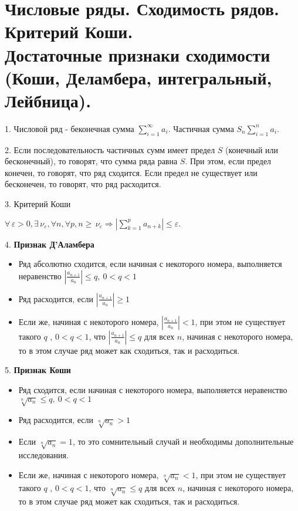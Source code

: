 \section{
	Числовые ряды. Сходимость рядов. Критерий Коши. \\
    Достаточные признаки сходимости (Коши, Деламбера, интегральный, Лейбница). 
}

1. Числовой ряд - беконечная сумма $\displaystyle \sum _{{i=1}}^{{\infty }}a_{i}$. Частичная сумма $\displaystyle S_n  \sum _{{i=1}}^{{n}}a_{i}$. 

2. Если последовательность частичных сумм имеет предел ${\displaystyle S}$ (конечный или бесконечный), 
то говорят, что сумма ряда равна ${\displaystyle S.}$ При этом, если предел конечен, то говорят, что ряд сходится. 
Если предел не существует или бесконечен, то говорят, что ряд расходится.

3. Критерий Коши

$
{\displaystyle \forall \,\varepsilon >0,\exists \,\nu _{\varepsilon },\forall n,\forall p,}
{\displaystyle n\geqslant \,\nu _{\varepsilon }\Rightarrow \left|\sum _{k=1}^{p}{a_{n+k}}\right|\leqslant \varepsilon .}
$

4. \textbf{Признак Д'Аламбера}
\begin{itemize}
    \item Ряд абсолютно сходится, если начиная с некоторого номера, выполняется неравенство
    ${\displaystyle \left|{\frac {a_{n+1}}{a_{n}}}\right|\leqslant q,~0<q<1}$
    \item Ряд расходится, если ${\displaystyle \left|{\frac {a_{n+1}}{a_{n}}}\right|\geqslant 1}$
    \item Если же, начиная с некоторого номера, 
    ${\displaystyle \left|{\frac {a_{n+1}}{a_{n}}}\right|<1}$, при этом не существует такого ${\displaystyle q}$ , 
    ${\displaystyle 0<q<1}$, что ${\displaystyle \left|{\frac {a_{n+1}}{a_{n}}}\right|\leqslant q}$ для всех ${\displaystyle n}$, 
    начиная с некоторого номера, то в этом случае ряд может как сходиться, так и расходиться.
\end{itemize}

5. \textbf{Признак Коши}
\begin{itemize}
    \item Ряд сходится, если начиная с некоторого номера, выполняется неравенство
    $\displaystyle \sqrt[{n}]{a_{n}} \leq q,~0<q<1$
    \item Ряд расходится, если ${\displaystyle {\sqrt[{n}]{a_{n}}}>1}$
    \item Если ${\displaystyle {\sqrt[{n}]{a_{n}}}=1}$, то это сомнительный случай и необходимы дополнительные исследования.
    \item Если же, начиная с некоторого номера, 
    ${\displaystyle {\sqrt[{n}]{a_{n}}}<1}$, при этом не существует такого ${\displaystyle q}$ , 
    ${\displaystyle 0<q<1}$, что $ {\displaystyle {\sqrt[{n}]{a_{n}}}\leqslant q}$ для всех ${\displaystyle n}$, 
    начиная с некоторого номера, то в этом случае ряд может как сходиться, так и расходиться.
\end{itemize}

